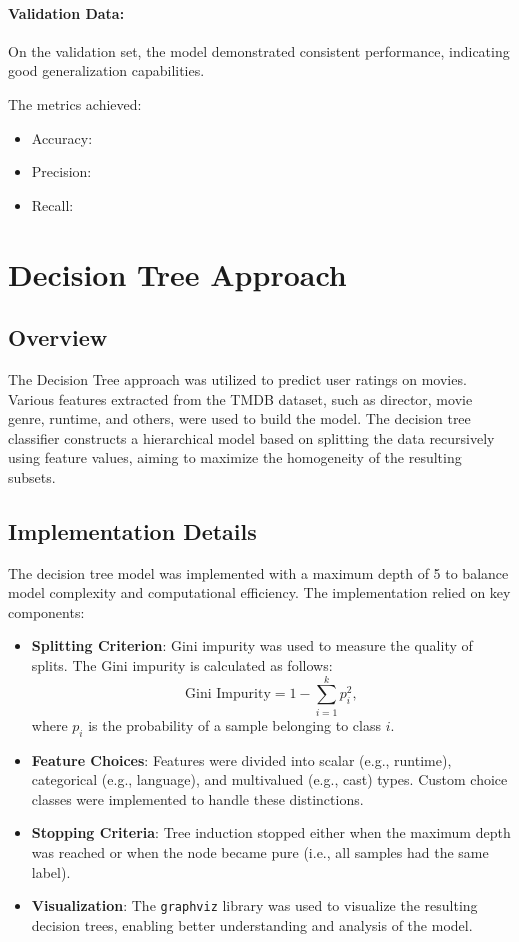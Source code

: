 \documentclass[a4paper,10pt]{article}
\begin{document}
\paragraph{Validation Data:}
On the validation set, the model demonstrated consistent performance,
indicating good generalization capabilities.

The metrics achieved:
\begin{itemize}
    \item Accuracy:
    \item Precision:
    \item Recall:
\end{itemize}

\section{Decision Tree Approach}
\subsection{Overview}
The Decision Tree approach was utilized to predict user
ratings on movies.
Various features extracted from the TMDB dataset,
such as director, movie genre, runtime, and others,
were used to build the model.
The decision tree classifier constructs a hierarchical
model based on splitting the data recursively using
feature values, aiming to maximize the homogeneity
of the resulting subsets.

\subsection{Implementation Details}
The decision tree model was implemented with a maximum depth
of 5 to balance model complexity and computational efficiency.
The implementation relied on key components:

\begin{itemize}
    \item \textbf{Splitting Criterion}: Gini impurity was used to measure the quality of splits. The Gini impurity is calculated as follows:
    \begin{equation}
    \text{Gini Impurity} = 1 - \sum_{i=1}^{k} p_i^2,
    \end{equation}
    where $p_i$ is the probability of a sample belonging to class $i$.

    \item \textbf{Feature Choices}: Features were divided into scalar (e.g., runtime), categorical (e.g., language), and multivalued (e.g., cast) types. Custom choice classes were implemented to handle these distinctions.

    \item \textbf{Stopping Criteria}: Tree induction stopped either when the maximum depth was reached or when the node became pure (i.e., all samples had the same label).

    \item \textbf{Visualization}: The \texttt{graphviz} library was used to visualize the resulting decision trees, enabling better understanding and analysis of the model.
\end{itemize}
\end{document}
